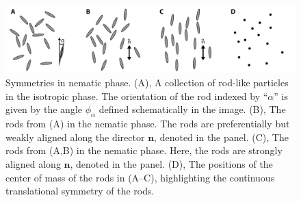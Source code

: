 \begin{figure}[h]
  \centering
  \includegraphics{figures/C2/Ch2-Figs_NematicSym.png}
  \caption{ Symmetries in nematic phase. (A), A collection of rod-like particles in the isotropic phase.
  The orientation of the rod indexed by ``$\alpha$'' is given by the angle $\phi_{\alpha}$ defined schematically in the image.
  (B), The rods from (A) in the nematic phase.
  The rods are preferentially but weakly aligned along the director $\mathbf{n}$, denoted in the panel.
  (C), The rods from (A,B) in the nematic phase. Here, the rods are strongly aligned along $\mathbf{n}$, denoted in the panel.
  (D), The positions of the center of mass of the rods in (A--C), highlighting the continuous translational symmetry of the rods.}\label{f:2-NematicSym}
\end{figure}

